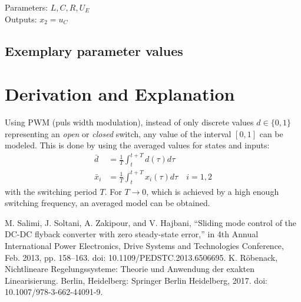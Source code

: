 \documentclass[10pt,a4paper]{article}
\begin{document}
	\noindent
	Parameters: $L, C, R, U_E$ %
	\\
	Outputs: $x_2 = u_C$
	
	
	
	
	\subsection{Exemplary parameter values}
	

	
	\section{Derivation and Explanation} %
	Using PWM (puls width modulation), instead of only discrete values $d\in\{0,1\}$ representing an \textit{open} or \textit{closed} switch, 
	any value of the interval $[0,1]$ can be modeled. This is done by using the averaged values for states and inputs:
	\begin{align*}
		\bar{d} &= \frac{1}{T}\int_t^{t+T} d(\tau)d\tau \\
		\bar{x}_i &= \frac{1}{T}\int_t^{t+T} x_i(\tau)d\tau \quad i=1,2
	\end{align*}
	with the switching period $T$. For $T\rightarrow 0$, which is achieved by a high enough switching frequency, an averaged model can be obtained.
	
	
	\begin{thebibliography}{10}		
		M. Salimi, J. Soltani, A. Zakipour, and V. Hajbani, “Sliding mode control of the DC-DC flyback converter with zero steady-state error,” in 4th Annual International Power Electronics, Drive Systems and Technologies Conference, Feb. 2013, pp. 158–163. doi: 10.1109/PEDSTC.2013.6506695.
		K. Röbenack, Nichtlineare Regelungssysteme: Theorie und Anwendung der exakten Linearisierung. Berlin, Heidelberg: Springer Berlin Heidelberg, 2017. doi: 10.1007/978-3-662-44091-9.
	\end{thebibliography}
\end{document}
